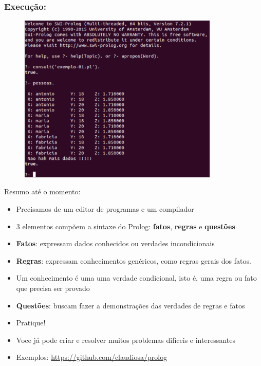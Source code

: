 \documentclass[sans]{beamer}
\begin{document}
\begin{frame}
\frametitle{Execução:}
\begin{figure}[!htb]
\centering
\includegraphics[width=0.85\textwidth , height=0.7\textheight]{figuras/prologcomposto.pdf}
\label{fig_fluxo_pxyz_execucao}
\end{figure}
\end{frame}


\begin{frame}[fragile]   %

\begin{block}{Resumo até o momento:}

\begin{itemize}
\item Precisamos de um editor de programas e um compilador
\item $3$ elementos compõem a sintaxe do Prolog: \textbf{fatos}, \textbf{regras} e \textbf{questões}
\item \textbf{Fatos}: expressam dados conhecidos ou verdades incondicionais
\item \textbf{Regras}: expressam conhecimentos genéricos, como regras gerais dos fatos.
\item Um conhecimento é uma uma verdade condicional, isto é, uma regra ou
fato que precisa ser provado
\item \textbf{Questões}: buscam fazer a demonstrações das verdades de regras e fatos
\item Pratique!
\item Voce já pode criar e resolver muitos problemas difíceis e interessantes
\item Exemplos: \url{https://github.com/claudiosa/prolog}
\end{itemize}

\end{block}
\end{frame}
\end{document}
